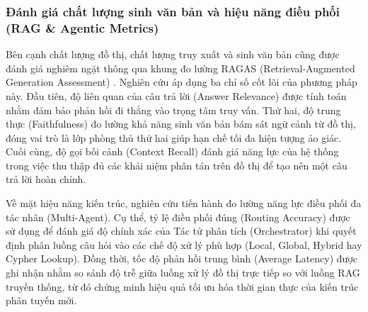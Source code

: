 \subsubsection{Đánh giá chất lượng sinh văn bản và hiệu năng điều phối (RAG \& Agentic Metrics)}

Bên cạnh chất lượng đồ thị, chất lượng truy xuất và sinh văn bản cũng được đánh giá nghiêm ngặt thông qua khung đo lường RAGAS (Retrieval-Augmented Generation Assessment) \cite{es2023ragas}. Nghiên cứu áp dụng ba chỉ số cốt lõi của phương pháp này. Đầu tiên, độ liên quan của câu trả lời (Answer Relevance) được tính toán nhằm đảm bảo phản hồi đi thẳng vào trọng tâm truy vấn. Thứ hai, độ trung thực (Faithfulness) đo lường khả năng sinh văn bản bám sát ngữ cảnh từ đồ thị, đóng vai trò là lớp phòng thủ thứ hai giúp hạn chế tối đa hiện tượng ảo giác. Cuối cùng, độ gọi bối cảnh (Context Recall) đánh giá năng lực của hệ thống trong việc thu thập đủ các khái niệm phân tán trên đồ thị để tạo nên một câu trả lời hoàn chỉnh.

Về mặt hiệu năng kiến trúc, nghiên cứu tiến hành đo lường năng lực điều phối đa tác nhân (Multi-Agent). Cụ thể, tỷ lệ điều phối đúng (Routing Accuracy) được sử dụng để đánh giá độ chính xác của Tác tử phân tích (Orchestrator) khi quyết định phân luồng câu hỏi vào các chế độ xử lý phù hợp (Local, Global, Hybrid hay Cypher Lookup). Đồng thời, tốc độ phản hồi trung bình (Average Latency) được ghi nhận nhằm so sánh độ trễ giữa luồng xử lý đồ thị trực tiếp so với luồng RAG truyền thống, từ đó chứng minh hiệu quả tối ưu hóa thời gian thực của kiến trúc phân tuyến mới.









\clearpage
